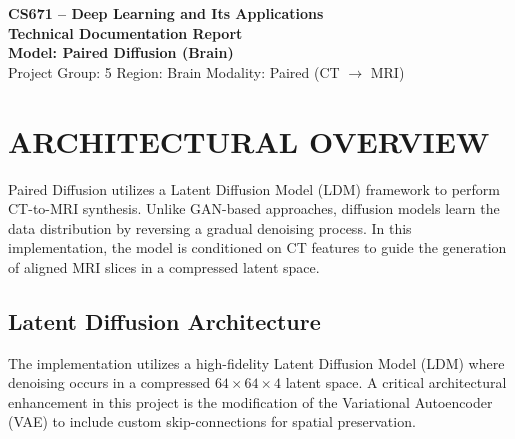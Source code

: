 \documentclass[10pt,a4paper]{article}
\begin{document}
\begin{tcolorbox}[
  enhanced,
  colback=softbg,
  colframe=brand,
  boxrule=0.9pt,
  arc=2mm,
  left=5pt,right=5pt,top=5pt,bottom=5pt
]
\centering
{\Large\bfseries\color{brand} CS671 -- Deep Learning and Its Applications}\\[2pt]
{\large\bfseries Technical Documentation Report}\\[6pt]
{\normalsize\bfseries Model: Paired Diffusion (Brain)}\\[4pt]
\small
Project Group: 5 \quad Region: Brain \quad Modality: Paired (CT $\to$ MRI)
\end{tcolorbox}

\section{ARCHITECTURAL OVERVIEW}
Paired Diffusion utilizes a Latent Diffusion Model (LDM) framework to perform CT-to-MRI synthesis. Unlike GAN-based approaches, diffusion models learn the data distribution by reversing a gradual denoising process. In this implementation, the model is conditioned on CT features to guide the generation of aligned MRI slices in a compressed latent space.

\subsection{Latent Diffusion Architecture}
The implementation utilizes a high-fidelity Latent Diffusion Model (LDM) where denoising occurs in a compressed $64 \times 64 \times 4$ latent space. A critical architectural enhancement in this project is the modification of the Variational Autoencoder (VAE) to include custom skip-connections for spatial preservation.
\end{document}
